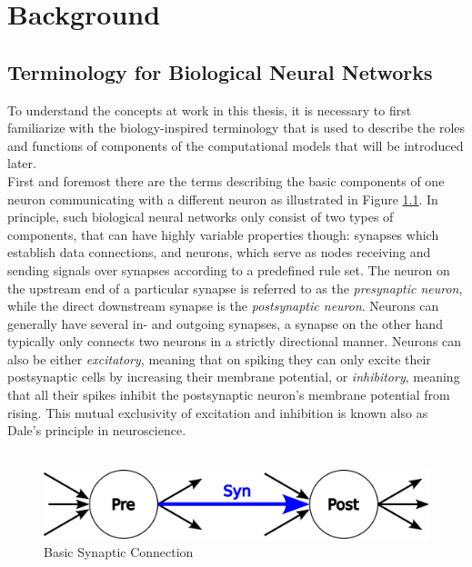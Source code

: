 
\chapter{Background} %

\label{Chapter2} %

\section{Terminology for Biological Neural Networks}
To understand the concepts at work in this thesis, it is necessary to first familiarize with the biology-inspired terminology that is used to describe the roles and functions of components of the computational models that will be introduced later.\\
First and foremost there are the terms describing the basic components of one neuron communicating with a different neuron as illustrated in Figure \ref{fig:pre_post_neuron}. In principle, such biological neural networks only consist of two types of components, that can have highly variable properties though: synapses which establish data connections, and neurons, which serve as nodes receiving and sending signals over synapses according to a predefined rule set. The neuron on the upstream end of a particular synapse is referred to as the \textit{presynaptic neuron}, while the direct downstream synapse is the \textit{postsynaptic neuron}. Neurons can generally have several in- and outgoing synapses, a synapse on the other hand typically only connects two neurons in a strictly directional manner. Neurons can also be either \textit{excitatory}, meaning that on spiking they can only excite their postsynaptic cells by increasing their membrane potential, or \textit{inhibitory}, meaning that all their spikes inhibit the postsynaptic neuron's membrane potential from rising. This mutual exclusivity of excitation and inhibition is known also as Dale's principle in neuroscience.
\\ \ \\
\begin{figure}[htbp]
    \centering
    \includegraphics[width=0.9\columnwidth]{Figures/pre_post_neuron.pdf}
    \caption{Basic Synaptic Connection}
    \label{fig:pre_post_neuron}
\end{figure}
